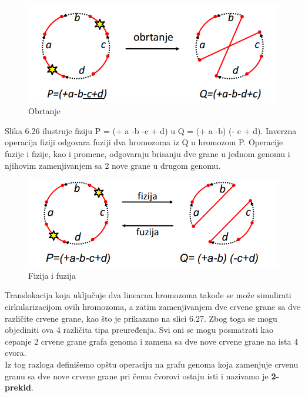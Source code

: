\begin{figure}[h!]
\centering
\includegraphics[scale=0.6]{poglavlja/6/slike/obrtanje.PNG}
\caption{Obrtanje}
\label{slika:X}
\end{figure}

Slika 6.26 ilustruje fiziju P = (+ a -b -c + d) u Q = (+ a -b) (- c + d).
Inverzna operacija fiziji odgovara fuziji dva hromozoma iz Q u hromozom P. Operacije fuzije i fizije, kao i promene, odgovaraju brisanju dve grane u jednom genomu i njihovim zamenjivanjem sa 2 nove grane u drugom genomu.\\

\begin{figure}[h!]
\centering
\includegraphics[scale=0.6]{poglavlja/6/slike/fizija_fusija.PNG}
\caption{Fizija i fuzija}
\label{slika:X}
\end{figure}

\newpage
Translokacija koja uključuje dva linearna hromozoma takođe se može simulirati cirkularizacijom ovih hromozoma, a zatim zamenjivanjem dve crvene grane sa dve različite crvene grane, kao što je prikazano na slici 6.27. Zbog toga se mogu objediniti ova 4 različita tipa preuređenja. Svi oni se mogu posmatrati kao cepanje 2 crvene grane grafa genoma i zamena sa dve nove crvene grane na ista 4 cvora. \\
Iz tog razloga definišemo opštu operaciju na grafu genoma
koja zamenjuje crvenu granu sa dve nove crvene grane pri čemu čvorovi ostaju isti i nazivamo je \textbf{2-prekid}.\\

